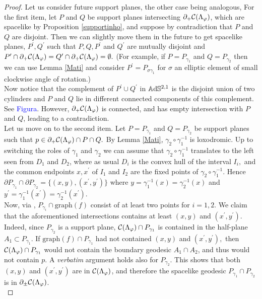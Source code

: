 \begin{proof}
    Let us consider future support planes, the other case being analogous, For the first item, let $P$ and $Q$ be support planes intersecting $\partial_+\mathcal{C}(\Lambda_\varphi)$, which are spacelike by Proposition \ref{supportinho}, and suppose by contradiction that $P$ and $Q$ are disjoint. Then we can slightly move them in the future to get spacelike planes, $P^{\prime}, Q^{\prime}$ such that $P,Q,P^{\prime}$ and $Q^{\prime}$ are mutually disjoint and $P^{\prime}\cap \partial_+\mathcal{C}(\Lambda_\varphi)=Q^{\prime}\cap\partial_+\mathcal{C}(\Lambda_\varphi)=\emptyset.$ (For example, if $P=P_{\gamma_1}$ and $Q=P_{\gamma_2}$ then we can use Lemma \ref{Mati} and consider $P^{\prime}=P_{\sigma\gamma_1}$ for $\sigma$ an elliptic element of small clockwise angle of rotation.)\\
    Now notice that the complement of $P^{\prime}\cup Q^{\prime}$ in $\mathbb{A}\mathrm{d}\mathbb{S}^{2,1}$ is the disjoint union of two cylinders and $P$ and $Q$ lie in different connected components of this complement. See \textcolor{blue}{Figura}. However, $\partial_+\mathcal{C}(\Lambda_\varphi)$ is connected, and has empty intersection with $P$ and $Q$, leading to a contradiction. \\
    Let us move on to the second item. Let $P=P_{\gamma_1}$ and $Q=P_{\gamma_2}$ be support planes such that $p\in\partial_+\mathcal{C}(\Lambda_\varphi)\cap P\cap Q.$ By Lemma \ref{Mati}, $\gamma_2\circ\gamma_1^{-1}$ is loxodromic.  Up to switching the roles of $\gamma_1$ and $\gamma_2$ we can assume that $\gamma_2\circ\gamma_1^{-1}$ translates to the left seen from $D_1$ and $D_2$, where as usual $D_i$ is the convex hull of the interval $I_i,$ and the common endpoints $x,x^{\prime}$ of $I_1$ and $I_2$ are the fixed points of $\gamma_2\circ\gamma_1^{-1}.$ Hence $\partial P_{\gamma_1}\cap\partial P_{\gamma_2}=\{(x,y),(x^{\prime}, y^{\prime})\}$ where $y=\gamma_1^{-1}(x)=\gamma_2^{-1}(x)$ and $y^{\prime}=\gamma_1^{-1}(x^{\prime})=\gamma_2^{-1}(x^{\prime})$. \\
    Now, via , $P_{\gamma_i}\cap\text{graph}(f)$ consist of at least two points for $i=1,2$. We claim that the aforementioned intersections contains at least $(x,y)$ and $(x^{\prime},y^{\prime})$. Indeed, since $P_{\gamma_2}$ is a support plane, $\mathcal{C}(\Lambda_\varphi)\cap P_{\gamma_1}$ is contained in the half-plane $A_1 \subset P_{\gamma_1}.$ If $\text{graph}(f)\cap P_{\gamma_1}$ had not contained $(x,y)$ and $(x^{\prime} ,y^{\prime}),$ then $\mathcal{C}(\Lambda_\varphi)\cap P_{\gamma_1}$ would not contain the boundary geodesic $A_1 \cap A_2$, and thus would not contain $p$. A \textit{verbatim} argument holds also for $P_{\gamma_2}$. This shows that both $(x,y)$ and $(x^{\prime},y^{\prime})$ are in $\mathcal{C}(\Lambda_\varphi)$, and therefore the spacelike geodesic $P_{\gamma_1}\cap P_{\gamma_2}$ is in $\partial_\pm\mathcal{C}(\Lambda_\varphi)$. \\ 
\end{proof}

